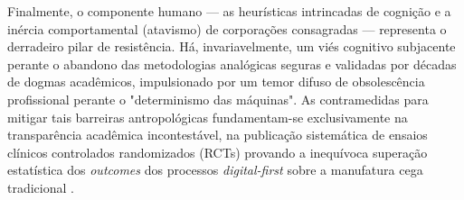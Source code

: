 Finalmente, o componente humano — as heurísticas intrincadas de cognição e a inércia comportamental (atavismo) de corporações consagradas — representa o derradeiro pilar de resistência. Há, invariavelmente, um viés cognitivo subjacente perante o abandono das metodologias analógicas seguras e validadas por décadas de dogmas acadêmicos, impulsionado por um temor difuso de obsolescência profissional perante o "determinismo das máquinas". As contramedidas para mitigar tais barreiras antropológicas fundamentam-se exclusivamente na transparência acadêmica incontestável, na publicação sistemática de ensaios clínicos controlados randomizados (RCTs) provando a inequívoca superação estatística dos \textit{outcomes} dos processos \textit{digital-first} sobre a manufatura cega tradicional \cite{shen2024effectiveness}.
